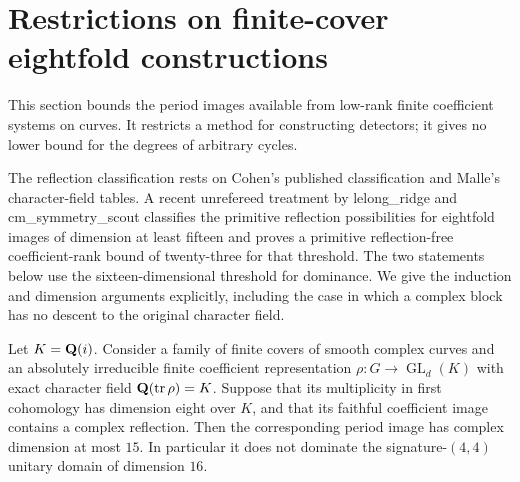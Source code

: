 \section{Restrictions on finite-cover eightfold constructions}
\label{sec:finite-cover-eightfolds}
This section bounds the period images available from low-rank finite coefficient systems on curves. It restricts a method for constructing detectors; it gives no lower bound for the degrees of arbitrary cycles.

The reflection classification rests on Cohen's published classification and Malle's character-field tables. A recent unrefereed treatment by lelong\_ridge and cm\_symmetry\_scout \cite[Theorems~A--B and \S\S2,5]{ReflectionSources} classifies the primitive reflection possibilities for eightfold images of dimension at least fifteen and proves a primitive reflection-free coefficient-rank bound of twenty-three for that threshold. The two statements below use the sixteen-dimensional threshold for dominance. We give the induction and dimension arguments explicitly, including the case in which a complex block has no descent to the original character field.

\begin{theorem}\label{thm:gaussian-reflections}
Let $K=\mathbf Q(i)$. Consider a family of finite covers of smooth complex
curves and an absolutely irreducible finite coefficient representation
$\rho:G\to\operatorname{GL}_d(K)$ with exact character field
$\mathbf Q(\operatorname{tr}\rho)=K$. Suppose that its multiplicity in first
cohomology has dimension eight over $K$, and that its faithful coefficient
image contains a complex reflection. Then the corresponding period image
has complex dimension at most $15$. In particular it does not dominate
the signature-$(4,4)$ unitary domain of dimension $16$.
\end{theorem}

